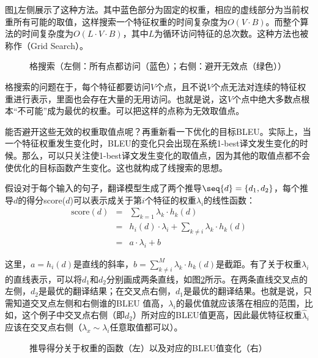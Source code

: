 \parinterval 图\ref{fig:7-21}左侧展示了这种方法。其中蓝色部分为固定的权重，相应的虚线部分为当前权重所有可能的取值，这样搜索一个特征权重的时间复杂度为$O(V \cdot B)$。而整个算法的时间复杂度为$O(L \cdot V \cdot B)$，其中$L$为循环访问特征的总次数。这种方法也被称作{\small{}}（Grid Search）。

\begin{figure}[htp]
\centering

\caption{格搜索（左侧：所有点都访问（蓝色）；右侧：避开无效点（绿色））}
\label{fig:7-21}
\end{figure}

\parinterval 格搜索的问题在于，每个特征都要访问$V$个点，且不说$V$个点无法对连续的特征权重进行表示，里面也会存在大量的无用访问。也就是说，这$V$个点中绝大多数点根本“不可能”成为最优的权重。可以把这样的点称为无效取值点。

\parinterval 能否避开这些无效的权重取值点呢？再重新看一下优化的目标BLEU。实际上，当一个特征权重发生变化时，BLEU的变化只会出现在系统1-best译文发生变化的时候。那么，可以只关注使1-best译文发生变化的取值点，因为其他的取值点都不会使优化的目标函数产生变化。这也就构成了线搜索的思想。

\parinterval 假设对于每个输入的句子，翻译模型生成了两个推导$\seq{d} = \{d_1,d_2\}$，每个推导$d$的得分score($d$)可以表示成关于第$i$个特征的权重$\lambda_i$的线性函数：
\begin{eqnarray}
\textrm{score}(d) &=& \sum_{k=1} \lambda_k \cdot h_k (d) \nonumber \\
&=& h_i (d) \cdot \lambda_i + \sum_{k \neq i} \lambda_k \cdot h_k (d) \nonumber \\
&=& a \cdot \lambda_i + b
\label{eq:7-20}
\end{eqnarray}

\parinterval 这里，$a = h_i(d)$是直线的斜率，$b = \sum_{k \neq i}^{M} \lambda_k \cdot h_k (d)$是截距。有了关于权重$\lambda_i$的直线表示，可以将$d_1$和$d_2$分别画成两条直线，如图\ref{fig:7-22}所示。在两条直线交叉点的左侧，$d_2$是最优的翻译结果；在交叉点右侧，$d_1$是最优的翻译结果。也就是说，只需知道交叉点左侧和右侧谁的BLEU 值高，$\lambda_i$的最优值就应该落在相应的范围，比如，这个例子中交叉点右侧（即$d_2$）所对应的BLEU值更高，因此最优特征权重$\hat{\lambda}_i$应该在交叉点右侧（$\lambda_x \sim \lambda_i$任意取值都可以）。

\begin{figure}[htp]
\centering

\caption{推导得分关于权重的函数（左）以及对应的BLEU值变化（右）}
\label{fig:7-22}
\end{figure}

